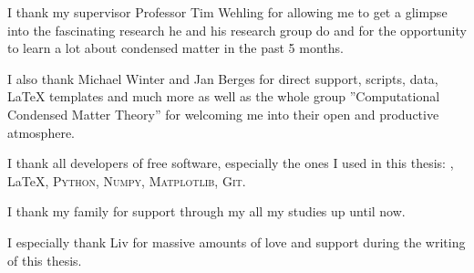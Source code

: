 \documentclass[main.tex]{subfiles}
\begin{document}
I thank my supervisor Professor Tim Wehling for allowing me to get a glimpse into the fascinating research he and his research group do and for the opportunity to learn a lot about condensed matter in the past 5 months.

I also thank Michael Winter and Jan Berges for direct support, scripts, data, \LaTeX\xspace templates and much more as well as the whole group ''Computational Condensed Matter Theory'' for welcoming me into their open and  productive atmosphere.

I thank all developers of free software, especially the ones I used in this thesis: \QE, \LaTeX, \textsc{Python}, \textsc{Numpy}, \textsc{Matplotlib}, \textsc{Git}.

I thank my family for support through my all my studies up until now.

I especially thank Liv for massive amounts of love and support during the writing of this thesis.
\end{document}
